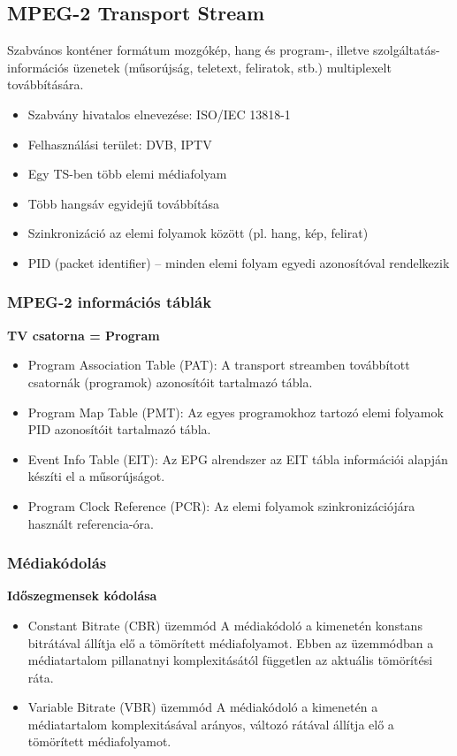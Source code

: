 \documentclass[10pt,a4paper]{article}
\begin{document}
\subsection{MPEG-2 Transport Stream}
Szabvános konténer formátum mozgókép, hang és
program-, illetve szolgáltatás-információs üzenetek
(műsorújság, teletext, feliratok, stb.) multiplexelt
továbbítására.
\begin{itemize}
	\item Szabvány hivatalos elnevezése: ISO/IEC 13818-1
	\item Felhasználási terület: DVB, IPTV
	\item Egy TS-ben több elemi médiafolyam
	\item Több hangsáv egyidejű továbbítása
	\item Szinkronizáció az elemi folyamok között (pl. hang, kép,
	felirat)
	\item PID (packet identifier) – minden elemi folyam egyedi
	azonosítóval rendelkezik
\end{itemize}
\subsubsection{MPEG-2 információs táblák}
\textbf{TV csatorna = Program}
\begin{itemize}
	\item Program Association Table (PAT): A transport
	streamben továbbított csatornák (programok) azonosítóit
	tartalmazó tábla.
	\item Program Map Table (PMT): Az egyes programokhoz
	tartozó elemi folyamok PID azonosítóit tartalmazó tábla.
	\item Event Info Table (EIT): Az EPG alrendszer az EIT tábla
	információi alapján készíti el a műsorújságot.
	\item Program Clock Reference (PCR): Az elemi folyamok
	szinkronizációjára használt referencia-óra. 
\end{itemize}
\subsubsection{Médiakódolás}
\textbf{Időszegmensek kódolása}
\begin{itemize}
	\item Constant Bitrate (CBR) üzemmód
	A médiakódoló a kimenetén konstans bitrátával állítja elő a
	tömörített médiafolyamot.
	Ebben az üzemmódban a médiatartalom pillanatnyi
	komplexitásától független az aktuális tömörítési ráta.
	\item Variable Bitrate (VBR) üzemmód
	A médiakódoló a kimenetén a médiatartalom
	komplexitásával arányos, változó rátával állítja elő a
	tömörített médiafolyamot.
\end{itemize}
\end{document}
